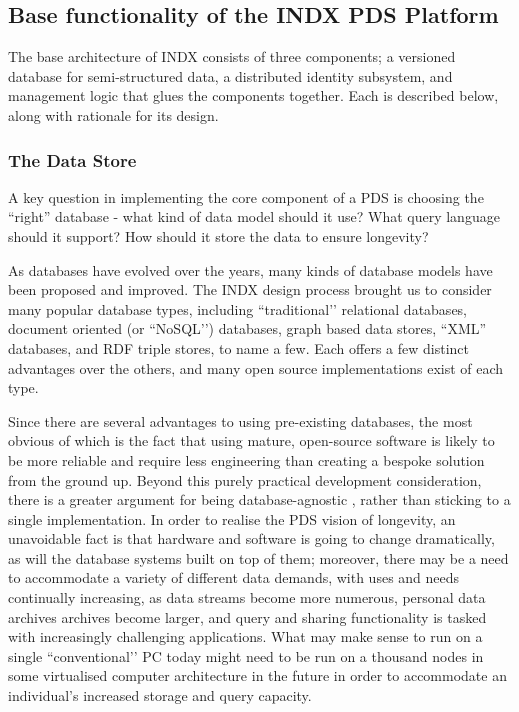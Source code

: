 \documentclass[graybox]{svmult}
\begin{document}
\subsection{Base functionality of the INDX PDS Platform}

The base architecture of INDX consists of three components; a versioned database for semi-structured data, a distributed identity subsystem, and management logic that glues the components together.   Each is described below, along with rationale for its design.

\subsubsection{The Data Store}
A key question in implementing the core component of a PDS is choosing the “right” database - what kind of data model should it use? What query language should it support? How should it store the data to ensure longevity? 

As databases have evolved over the years, many kinds of database models have been proposed and improved.  The INDX design process brought us to consider many popular database types, including ``traditional’’ relational databases, document oriented (or ``NoSQL’’) databases, graph based data stores, “XML” databases, and RDF triple stores, to name a few.  Each offers a few distinct advantages over the others, and many open source implementations exist of each type.

Since there are several advantages to using pre-existing databases, the most obvious of which is the fact that using mature, open-source software is likely to be more reliable and require less engineering than creating a bespoke solution from the ground up. Beyond this purely practical development consideration, there is a greater argument for being database-agnostic \cite{chohan2011database}, rather than sticking to a single implementation.  In order to realise the PDS vision of longevity, an unavoidable fact is that hardware and software is going to change dramatically, as will the database systems built on top of them; moreover, there may be a need to accommodate a variety of different data demands, with uses and needs continually increasing, as data streams become more numerous, personal data archives archives become larger, and query and sharing functionality is tasked with increasingly challenging applications.  What may make sense to run on a single ``conventional’’ PC today might need to be run on a thousand nodes in some virtualised computer architecture in the future in order to accommodate an individual’s increased storage and query capacity.
\end{document}

